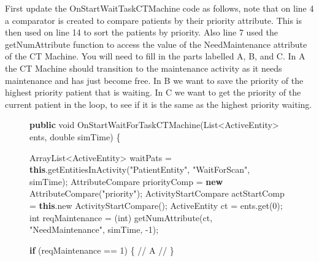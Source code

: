 \documentclass[
  10pt,
  a4paperpaper,
  DIV=11,
  numbers=noendperiod,
  oneside]{scrreprt}
\newenvironment{Shaded}{\begin{snugshade}}{\end{snugshade}}
\newcommand{\BuiltInTok}[1]{\textcolor[rgb]{0.00,0.23,0.31}{#1}}
\newcommand{\CommentTok}[1]{\textcolor[rgb]{0.37,0.37,0.37}{#1}}
\newcommand{\ControlFlowTok}[1]{\textcolor[rgb]{0.00,0.23,0.31}{\textbf{#1}}}
\newcommand{\DataTypeTok}[1]{\textcolor[rgb]{0.68,0.00,0.00}{#1}}
\newcommand{\DecValTok}[1]{\textcolor[rgb]{0.68,0.00,0.00}{#1}}
\newcommand{\FunctionTok}[1]{\textcolor[rgb]{0.28,0.35,0.67}{#1}}
\newcommand{\KeywordTok}[1]{\textcolor[rgb]{0.00,0.23,0.31}{\textbf{#1}}}
\newcommand{\NormalTok}[1]{\textcolor[rgb]{0.00,0.23,0.31}{#1}}
\newcommand{\OperatorTok}[1]{\textcolor[rgb]{0.37,0.37,0.37}{#1}}
\newcommand{\StringTok}[1]{\textcolor[rgb]{0.13,0.47,0.30}{#1}}
\begin{document}
First update the OnStartWaitTaskCTMachine code as follows, note that on
line 4 a comparator is created to compare patients by their priority
attribute. This is then used on line 14 to sort the patients by
priority. Also line 7 used the getNumAttribute function to access the
value of the NeedMaintenance attribute of the CT Machine. You will need
to fill in the parts labelled A, B, and C. In A the CT Machine should
transition to the maintenance activity as it needs maintenance and has
just become free. In B we want to save the priority of the highest
priority patient that is waiting. In C we want to get the priority of
the current patient in the loop, to see if it is the same as the highest
priority waiting.

\begin{figure}

\begin{codebox}

\begin{Shaded}
\begin{Highlighting}[numbers=left,,]
\KeywordTok{public} \DataTypeTok{void} \FunctionTok{OnStartWaitForTaskCTMachine}\OperatorTok{(}\BuiltInTok{List}\OperatorTok{\textless{}}\NormalTok{ActiveEntity}\OperatorTok{\textgreater{}}\NormalTok{ ents}\OperatorTok{,} \DataTypeTok{double}\NormalTok{ simTime}\OperatorTok{)} \OperatorTok{\{}
    
  \BuiltInTok{ArrayList}\OperatorTok{\textless{}}\NormalTok{ActiveEntity}\OperatorTok{\textgreater{}}\NormalTok{ waitPats }\OperatorTok{=} \KeywordTok{this}\OperatorTok{.}\FunctionTok{getEntitiesInActivity}\OperatorTok{(}\StringTok{"PatientEntity"}\OperatorTok{,} \StringTok{"WaitForScan"}\OperatorTok{,}\NormalTok{ simTime}\OperatorTok{);}
\NormalTok{  AttributeCompare priorityComp }\OperatorTok{=} \KeywordTok{new} \FunctionTok{AttributeCompare}\OperatorTok{(}\StringTok{"priority"}\OperatorTok{);}
\NormalTok{  ActivityStartCompare actStartComp }\OperatorTok{=} \KeywordTok{this}\OperatorTok{.}\FunctionTok{new} \FunctionTok{ActivityStartCompare}\OperatorTok{();}        
\NormalTok{  ActiveEntity ct }\OperatorTok{=}\NormalTok{ ents}\OperatorTok{.}\FunctionTok{get}\OperatorTok{(}\DecValTok{0}\OperatorTok{);}
  \DataTypeTok{int}\NormalTok{ reqMaintenance }\OperatorTok{=} \OperatorTok{(}\DataTypeTok{int}\OperatorTok{)} \FunctionTok{getNumAttribute}\OperatorTok{(}\NormalTok{ct}\OperatorTok{,} \StringTok{"NeedMaintenance"}\OperatorTok{,}\NormalTok{ simTime}\OperatorTok{,} \OperatorTok{{-}}\DecValTok{1}\OperatorTok{);}
  
  \ControlFlowTok{if} \OperatorTok{(}\NormalTok{reqMaintenance }\OperatorTok{==} \DecValTok{1}\OperatorTok{)} \OperatorTok{\{}
    \CommentTok{// A //}
  \OperatorTok{\}}
    

\end{Highlighting}
\end{Shaded}
\end{codebox}
\end{figure}
\end{document}
